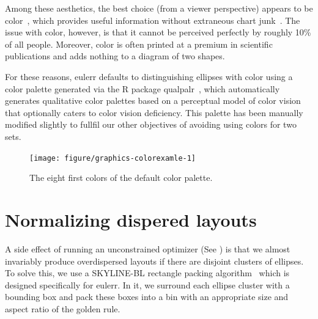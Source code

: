 \documentclass[
  a4paper,
  nofonts,
  nobib,
  nohyper,
  openany
]{tufte-book}\usepackage[]{graphicx}\usepackage[]{color}
\newenvironment{knitrout}{}{} %
\newcommand{\pkg}[1]{{\fontseries{b}\selectfont #1}}
\begin{document}
\begin{appendices}
Among these aesthetics, the best choice (from a viewer perspective) appears to be color~\citep{blake_2016}, which provides useful information without extraneous chart junk~\citep{tufte_2001}. The issue with color, however, is that it cannot be perceived perfectly by roughly 10\% of all people. Moreover, color is often printed at a premium in scientific publications and adds nothing to a diagram of two shapes.

For these reasons, \pkg{eulerr} defaults to distinguishing ellipses with color using a color palette generated via the R package \pkg{qualpalr}~\citep{larsson_2016}, which automatically generates qualitative color palettes based on a perceptual model of color vision that optionally caters to color vision deficiency. This palette has been manually modified slightly to fullfil our other objectives of avoiding using colors for two sets.

\begin{knitrout}
\color{fgcolor}\begin{figure}

{\centering \texttt{[image: figure/graphics-colorexamle-1]} 

}

\caption[The eight first colors of the default color palette]{The eight first colors of the default color palette.}\label{fig:colorexamle}
\end{figure}


\end{knitrout}

\section{Normalizing dispered layouts}
\label{sec:layout}

A side effect of running an unconstrained optimizer (See ) is that we almost invariably produce overdispersed layouts if there are disjoint clusters of ellipses. To solve this, we use a SKYLINE-BL rectangle packing algorithm~\citep{jylanki_2010} which is designed specifically for \pkg{eulerr}. In it, we surround each ellipse cluster with a bounding box and pack these boxes into a bin with an appropriate size and aspect ratio of the golden rule.

\end{appendices}

\backmatter



\end{document}
